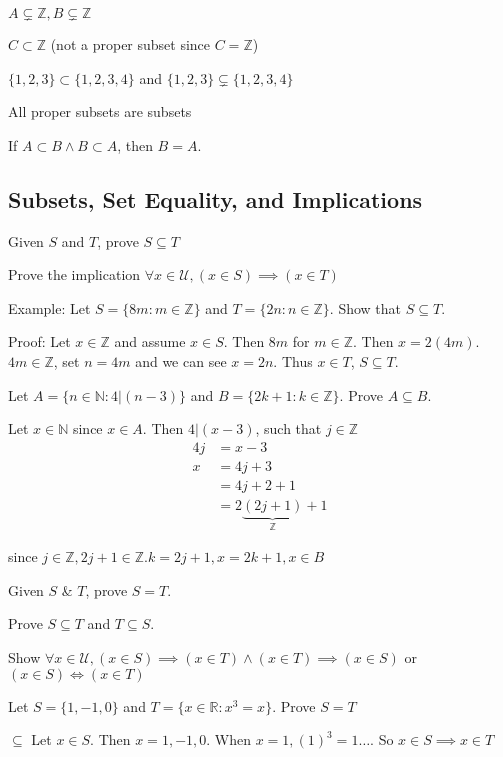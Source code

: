 \documentclass{article}
\begin{document}
$A \subsetneq \mathbb{Z}, B \subsetneq \mathbb{Z}$

$C \subset \mathbb{Z}$ (not a proper subset since $C = \mathbb{Z}$)

$\{1,2,3\} \subset \{1,2,3,4\}$ and $\{1,2,3\} \subsetneq \{1,2,3,4\}$

All proper subsets are subsets

If $A \subset B \wedge B \subset A$, then $B = A$.

\subsection{Subsets, Set Equality, and Implications}

Given $S$ and $T$, prove $S \subseteq T$

Prove the implication $\forall x \in \mathcal{U}, (x \in S) \implies (x \in T)$

Example: Let $S = \{8m: m \in \mathbb{Z}\}$ and $T = \{2n: n \in \mathbb{Z}\}$. Show that $S \subseteq T$.

Proof: Let $x \in \mathbb{Z}$ and assume $x \in S$. Then $8m$ for $m \in \mathbb{Z}$. Then $x = 2(4m)$. $4m \in \mathbb{Z}$, set $n=4m$ and we can see $x = 2n$. Thus $x \in T$, $S \subseteq T$.

Let $A = \{n \in \mathbb{N}: 4 \vert (n-3)\}$ and $B=\{2k+1:k \in \mathbb{Z}\}.$ Prove $A \subseteq B$.

Let $x \in \mathbb{N}$ since $x \in A$. Then $4 \vert (x-3)$, such that $j \in \mathbb{Z}$
\begin{align*}
    4j &= x-3 \\
    x &= 4j + 3 \\
    &= 4j + 2 + 1 \\
    &= 2 \underbrace{(2j + 1)}_{\mathbb{Z}} + 1
\end{align*}

since $j \in \mathbb{Z}, 2j+1 \in \mathbb{Z}. k = 2j+1, x = 2k+1, x \in B$

Given $S$ \& $T$, prove $S = T$.

Prove $S \subseteq T$ and $T \subseteq S$.

Show $\forall x \in \mathcal{U}, (x \in S) \implies (x \in T) \wedge (x \in T) \implies (x \in S)$ or $(x \in S) \iff (x \in T)$

Let $S = \{1,-1,0\}$ and $T = \{x \in \mathbb{R}: x^3 = x\}$. Prove $S = T$

$\subseteq$ Let $x \in S$. Then $x=1,-1,0$. When $x=1, (1)^3 = 1 \ldots$. So $x \in S \implies x \in T$
\end{document}
